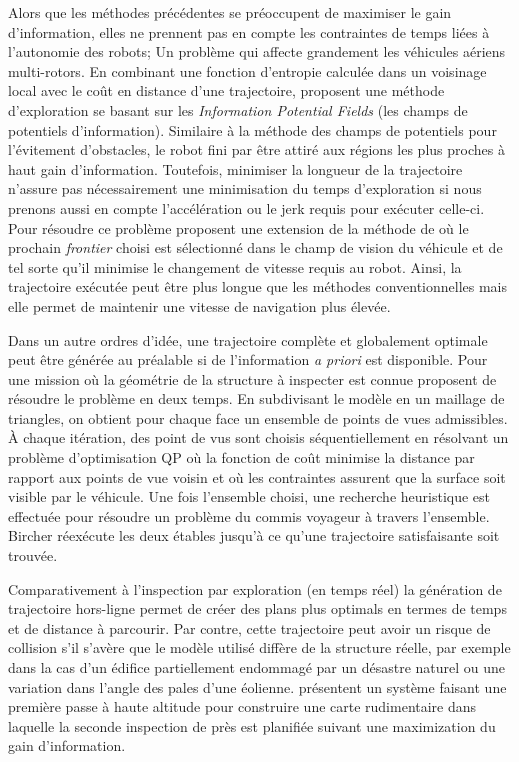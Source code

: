Alors que les méthodes précédentes se préoccupent de maximiser le gain d'information, elles ne prennent pas en compte les contraintes de temps liées à l'autonomie des robots; Un problème qui affecte grandement les véhicules aériens multi-rotors. En combinant une fonction d'entropie calculée dans un voisinage local avec le coût en distance d'une trajectoire, \citep{Wang2017} proposent une méthode d'exploration se basant sur les \textit{Information Potential Fields} (les champs de potentiels d'information). Similaire à la méthode des champs de potentiels pour l'évitement d'obstacles, le robot fini par être attiré aux régions les plus proches à haut gain d'information. Toutefois, minimiser la longueur de la trajectoire n'assure pas nécessairement une minimisation du temps d'exploration si nous prenons aussi en compte l'accélération ou le jerk requis pour exécuter celle-ci. Pour résoudre ce problème \citep{Cieslewski2017} proposent une extension de la méthode de \citep{Yamauchi1997} où le prochain \textit{frontier} choisi est sélectionné dans le champ de vision du véhicule et de tel sorte qu'il minimise le changement de vitesse requis au robot. Ainsi, la trajectoire exécutée peut être plus longue que les méthodes conventionnelles mais elle permet de maintenir une vitesse de navigation plus élevée.

Dans un autre ordres d'idée, une trajectoire complète et globalement optimale peut être générée au préalable si de l'information \textit{a priori} est disponible. Pour une mission où la géométrie de la structure à inspecter est connue \citep{Bircher2015} proposent de résoudre le problème en deux temps. En subdivisant le modèle en un maillage de triangles, on obtient pour chaque face un ensemble de points de vues admissibles. À chaque itération, des point de vus sont choisis séquentiellement en résolvant un problème d'optimisation QP où la fonction de coût minimise la distance par rapport aux points de vue voisin et où les contraintes assurent que la surface soit visible par le véhicule. Une fois l'ensemble choisi, une recherche heuristique est effectuée pour résoudre un problème du commis voyageur à travers l'ensemble. Bircher réexécute les deux étables jusqu'à ce qu'une trajectoire satisfaisante soit trouvée.

Comparativement à l'inspection par exploration (en temps réel) la génération de trajectoire hors-ligne permet de créer des plans plus optimals en termes de temps et de distance à parcourir. Par contre, cette trajectoire peut avoir un risque de collision s'il s'avère que le modèle utilisé diffère de la structure réelle, par exemple dans la cas d'un édifice partiellement endommagé par un désastre naturel ou une variation dans l'angle des pales d'une éolienne. \citep{Hepp2017} présentent un système faisant une première passe à haute altitude pour construire une carte rudimentaire dans laquelle la seconde inspection de près est planifiée suivant une maximization du gain d'information.

